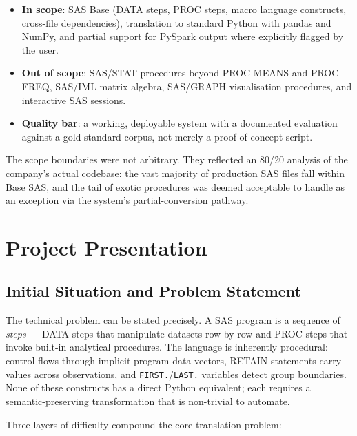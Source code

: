 \begin{itemize}
  \item \textbf{In scope}: SAS Base (DATA steps, PROC steps, macro language
    constructs, cross-file dependencies), translation to standard Python with
    pandas and NumPy, and partial support for PySpark output where explicitly
    flagged by the user.
  \item \textbf{Out of scope}: SAS/STAT procedures beyond PROC MEANS and
    PROC FREQ, SAS/IML matrix algebra, SAS/GRAPH visualisation procedures,
    and interactive SAS sessions.
  \item \textbf{Quality bar}: a working, deployable system with a documented
    evaluation against a gold-standard corpus, not merely a proof-of-concept
    script.
\end{itemize}

The scope boundaries were not arbitrary. They reflected an 80/20 analysis of
the company's actual codebase: the vast majority of production SAS files fall
within Base SAS, and the tail of exotic procedures was deemed acceptable to
handle as an exception via the system's partial-conversion pathway.

\section{Project Presentation}
\label{sec:project-presentation}

\subsection{Initial Situation and Problem Statement}
\label{subsec:problem}

The technical problem can be stated precisely. A SAS program is a sequence of
\emph{steps} --- DATA steps that manipulate datasets row by row and PROC steps
that invoke built-in analytical procedures. The language is inherently
procedural: control flows through implicit program data vectors, RETAIN
statements carry values across observations, and \texttt{FIRST.}/\texttt{LAST.}
variables detect group boundaries. None of these constructs has a direct Python
equivalent; each requires a semantic-preserving transformation that is
non-trivial to automate.

Three layers of difficulty compound the core translation problem:

